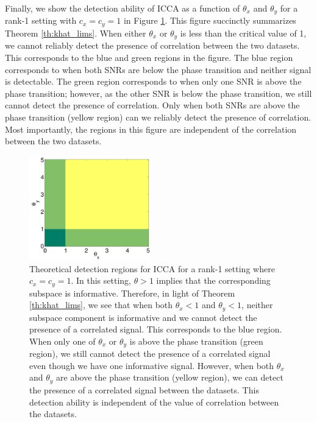 Finally, we show the detection ability of ICCA as a function of $\theta_x$ and $\theta_y$
for a rank-1 setting with $c_x=c_y=1$ in Figure \ref{fig:chpt4:theta_theta_heatmap}. This
figure succinctly summarizes Theorem \ref{th:khat_lims}. When either $\theta_x$ or
$\theta_y$ is less than the critical value of 1, we cannot reliably detect the presence of
correlation between the two datasets. This corresponds to the blue and green regions in
the figure. The blue region corresponds to when both SNRs are below the phase transition
and neither signal is detectable. The green region corresponds to when only one SNR is
above the phase transition; however, as the other SNR is below the phase transition, we
still cannot detect the presence of correlation. Only when both SNRs are above the phase
transition (yellow region) can we reliably detect the presence of correlation. Most
importantly, the regions in this figure are independent of the correlation between the two
datasets.

\begin{figure}
  \begin{center}
    \includegraphics[width=0.47\textwidth]{chpt4_det_corr/figs/theta_theta_heatmap.pdf}
    \caption{Theoretical detection regions for ICCA for a rank-1 setting where
      $c_x=c_y=1$. In this setting, $\theta>1$ implies that the corresponding subspace is
      informative. Therefore, in light of Theorem \ref{th:khat_lims}, we see that when
      both $\theta_x<1$ and $\theta_y<1$, neither subspace component is informative and we
      cannot detect the presence of a correlated signal. This corresponds to the blue
      region. When only one of $\theta_x$ or $\theta_y$ is above the phase transition
      (green region), we still cannot detect the presence of a correlated signal even
      though we have one informative signal. However, when both $\theta_x$ and $\theta_y$
      are above the phase transition (yellow region), we can detect the presence of a
      correlated signal between the datasets. This detection ability is independent of the
      value of correlation between the datasets. }
    \label{fig:chpt4:theta_theta_heatmap}
  \end{center}
\end{figure}

